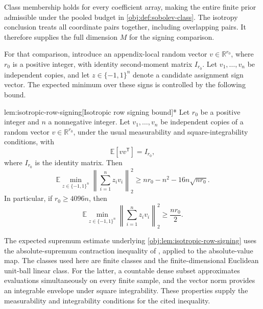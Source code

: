 Class membership holds for every coefficient array, making the entire finite prior admissible under the pooled budget in \cref{obj:def:sobolev-class}. The isotropy conclusion treats all coordinate pairs together, including overlapping pairs. It therefore supplies the full dimension \(M\) for the signing comparison.

For that comparison, introduce an appendix-local random vector \(v\in\mathbb R^{r_0}\), where \(r_0\) is a positive integer, with identity second-moment matrix \(I_{r_0}\). Let \(v_1,\ldots,v_n\) be independent copies, and let \(z\in\{-1,1\}^n\) denote a candidate assignment sign vector. The expected minimum over these signs is controlled by the following bound.

\begin{lemmav}{lem:isotropic-row-signing}[Isotropic row signing bound]*
Let \(r_0\) be a positive integer and \(n\) a nonnegative integer. Let \(v_1,\ldots,v_n\) be independent copies of a random vector \(v\in\mathbb R^{r_0}\), under the usual measurability and square-integrability conditions, with
\[
\mathbb E[vv^{\mathsf T}]=I_{r_0},
\]
where \(I_{r_0}\) is the identity matrix. Then
\[
\mathbb E\min_{z\in\{-1,1\}^n}
\left\|\sum_{i=1}^n z_i v_i\right\|_2^2
\geq nr_0-n^2-16n\sqrt{nr_0}.
\]
In particular, if \(r_0\geq4096n\), then
\[
\mathbb E\min_{z\in\{-1,1\}^n}
\left\|\sum_{i=1}^n z_i v_i\right\|_2^2
\geq \frac{nr_0}{2}.
\]
\end{lemmav}

The expected supremum estimate underlying \cref{obj:lem:isotropic-row-signing} uses the absolute-supremum contraction inequality of \citet[Theorem~12(4), with Rademacher complexity as in Definition~2]{BartlettMendelson2002Complexities}, applied to the absolute-value map. The classes used here are finite classes and the finite-dimensional Euclidean unit-ball linear class. For the latter, a countable dense subset approximates evaluations simultaneously on every finite sample, and the vector norm provides an integrable envelope under square integrability. These properties supply the measurability and integrability conditions for the cited inequality.

